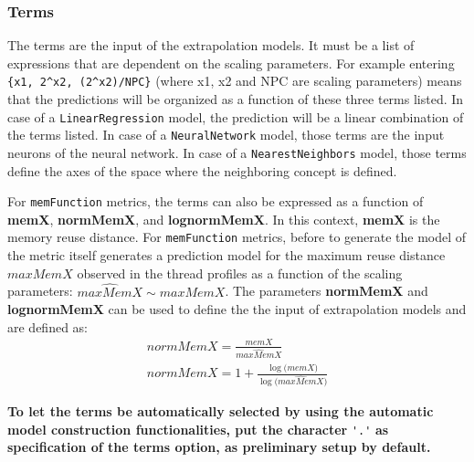 \documentclass[a4paper, 10pt]{article}
\begin{document}
\subsubsection{Terms}
\label{sec:terms}
The terms are the input of the extrapolation models. It must be a list of expressions that are dependent on the scaling parameters.
For example entering \verb!{x1, 2^x2, (2^x2)/NPC}! (where x1, x2 and NPC are scaling parameters) means that the predictions will
be organized as a function of these three terms listed. In case of a \verb!LinearRegression! model, the prediction will be a linear
combination of the terms listed. In case of a \verb!NeuralNetwork! model, those terms are the input neurons of the neural network.
In case of a \verb!NearestNeighbors! model, those terms define the axes of the space where the neighboring concept is defined.

For \verb!memFunction! metrics, the terms can also be expressed as a function of \textbf{memX}, \textbf{normMemX}, and
\textbf{lognormMemX}. In this context, \textbf{memX} is the memory reuse distance. For \verb!memFunction! metrics,
before to generate the model of the metric itself \ex generates a prediction model for the maximum reuse distance $maxMemX$ observed in the
thread profiles as a function of the scaling parameters: $\widehat{maxMemX}\sim maxMemX$.
The parameters \textbf{normMemX} and \textbf{lognormMemX} can be used to define the the input of extrapolation models and are defined as:
\begin{eqnarray}
 {normMemX}=\frac{{memX}}{\widehat{maxMemX}} \\
 {normMemX}=1 + \frac{\log\big({memX}\big)}{\log\big(\widehat{maxMemX}\big)}
\end{eqnarray}


\textbf{To let the terms be automatically selected by using the automatic model construction functionalities, put the character} \verb!'.'!
\textbf{as specification of the terms option, as preliminary setup by default.}
\end{document}
